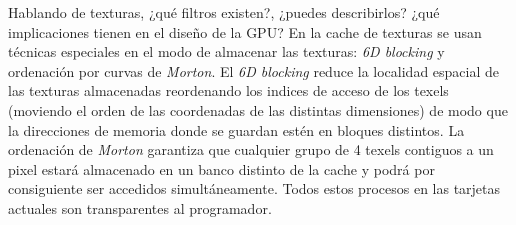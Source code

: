 \begin{pregunta}{Hablando de texturas, ¿qué filtros existen?, ¿puedes describirlos? ¿qué
implicaciones tienen en el diseño de la GPU?}
En la cache de texturas se usan técnicas
especiales en el modo de almacenar las texturas: \emph{6D blocking}
y ordenación por curvas de \emph{Morton}. El \emph{6D blocking} reduce la
localidad espacial de las texturas almacenadas reordenando los indices de acceso
de los texels (moviendo el orden de las coordenadas de las distintas
dimensiones) de modo que la direcciones de memoria donde se guardan estén en
bloques distintos. La ordenación de \emph{Morton} garantiza que cualquier grupo
de 4 texels contiguos a un pixel estará almacenado en un banco distinto de la
cache y podrá por consiguiente ser accedidos simultáneamente. Todos estos
procesos en las tarjetas actuales son transparentes al programador.

\end{pregunta}
